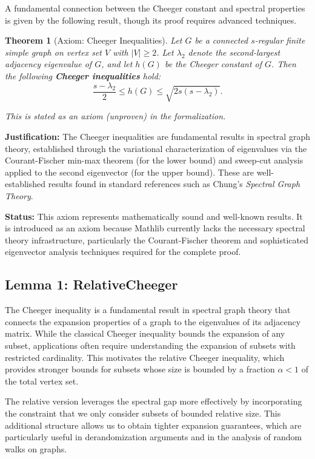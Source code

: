 \documentclass[11pt]{article}
\theoremstyle{plain}
\newtheorem*{theorem}{Theorem}
\theoremstyle{definition}
\theoremstyle{remark}
\begin{document}
A fundamental connection between the Cheeger constant and spectral properties is given by the following result, though its proof requires advanced techniques.

\begin{theorem}[Axiom: Cheeger Inequalities]
Let $G$ be a connected $s$-regular finite simple graph on vertex set $V$ with $|V| \geq 2$. Let $\lambda_2$ denote the second-largest adjacency eigenvalue of $G$, and let $h(G)$ be the Cheeger constant of $G$. Then the following \textbf{Cheeger inequalities} hold:
\[
\frac{s - \lambda_2}{2} \leq h(G) \leq \sqrt{2s(s - \lambda_2)}.
\]

\textit{This is stated as an axiom (unproven) in the formalization.}
\end{theorem}

\textbf{Justification:} The Cheeger inequalities are fundamental results in spectral graph theory, established through the variational characterization of eigenvalues via the Courant-Fischer min-max theorem (for the lower bound) and sweep-cut analysis applied to the second eigenvector (for the upper bound). These are well-established results found in standard references such as Chung's \textit{Spectral Graph Theory}.

\textbf{Status:} This axiom represents mathematically sound and well-known results. It is introduced as an axiom because Mathlib currently lacks the necessary spectral theory infrastructure, particularly the Courant-Fischer theorem and sophisticated eigenvector analysis techniques required for the complete proof.

\vspace{1em}

\subsection{Lemma 1: RelativeCheeger}

The Cheeger inequality is a fundamental result in spectral graph theory that connects the expansion properties of a graph to the eigenvalues of its adjacency matrix. While the classical Cheeger inequality bounds the expansion of any subset, applications often require understanding the expansion of subsets with restricted cardinality. This motivates the relative Cheeger inequality, which provides stronger bounds for subsets whose size is bounded by a fraction $\alpha < 1$ of the total vertex set.

The relative version leverages the spectral gap more effectively by incorporating the constraint that we only consider subsets of bounded relative size. This additional structure allows us to obtain tighter expansion guarantees, which are particularly useful in derandomization arguments and in the analysis of random walks on graphs.
\end{document}
